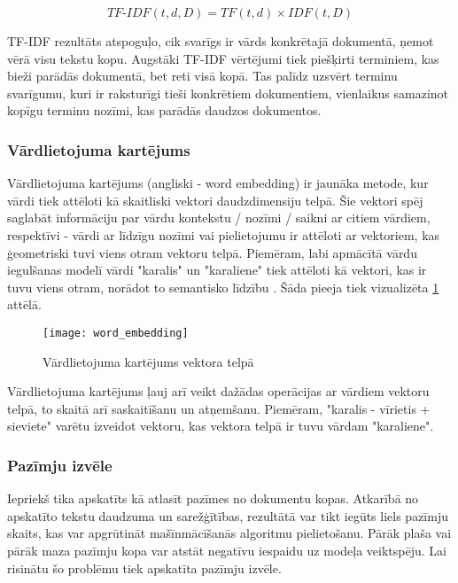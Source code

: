 \begin{equation}
TF\text{-}IDF(t, d, D) = TF(t, d) \times IDF(t, D)
\end{equation}

TF-IDF rezultāts atspoguļo, cik svarīgs ir vārds konkrētajā dokumentā, ņemot vērā visu tekstu kopu. Augstāki TF-IDF vērtējumi tiek piešķirti terminiem, kas bieži parādās dokumentā, bet reti visā kopā. Tas palīdz uzsvērt terminu svarīgumu, kuri ir raksturīgi tieši konkrētiem dokumentiem, vienlaikus samazinot kopīgu terminu nozīmi, kas parādās daudzos dokumentos.

\subsubsection{Vārdlietojuma kartējums}
Vārdlietojuma kartējums (angliski - word embedding) ir jaunāka metode, kur vārdi tiek attēloti kā skaitliski vektori daudzdimensiju telpā. Šie vektori spēj saglabāt informāciju par vārdu kontekstu / nozīmi / saikni ar citiem vārdiem, respektīvi -  vārdi ar līdzīgu nozīmi vai pielietojumu ir attēloti ar vektoriem, kas ģeometriski tuvi viens otram vektoru telpā. Piemēram, labi apmācītā vārdu iegulšanas modelī vārdi "karalis" un "karaliene" tiek attēloti kā vektori, kas ir tuvu viens otram, norādot to semantisko līdzību \cite{BaeldungEmbedding}. Šāda pieeja tiek vizualizēta \ref{fig:wordembedding} attēlā.

\begin{figure}[H]
	\texttt{[image: word\_embedding]}
	\caption{Vārdlietojuma kartējums vektora telpā \cite{BaeldungEmbedding} }
	\label{fig:wordembedding}
\end{figure}

Vārdlietojuma kartējums ļauj arī veikt dažādas operācijas ar vārdiem vektoru telpā, to skaitā arī  saskaitīšanu un atņemšanu. Piemēram, "karalis - vīrietis + sieviete" varētu izveidot vektoru, kas vektora telpā ir tuvu vārdam "karaliene".

\subsubsection{Pazīmju izvēle}
Iepriekš tika apskatīts kā atlasīt pazīmes no dokumentu kopas. Atkarībā no apskatīto tekstu daudzuma un sarežģītības, rezultātā var tikt iegūts liels pazīmju skaits, kas var apgrūtināt mašīnmācīšanās algoritmu pielietošanu. Pārāk plaša vai pārāk maza pazīmju kopa var atstāt negatīvu iespaidu uz modeļa veiktspēju. Lai risinātu šo problēmu tiek apskatīta pazīmju izvēle.

